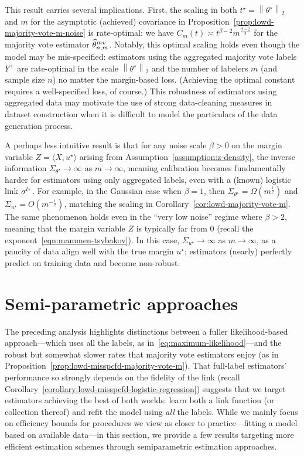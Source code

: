 \documentclass[11pt]{article}
\newcommand{\norm}[1]{\left\|{#1}\right\|} %
\newcommand{\what}[1]{\widehat{#1}}
\newcommand{\majY}{Y^+}
\newcommand{\lr}{^{\textup{lr}}}
\newcommand{\mv}{^{\textup{mv}}}
\newcommand{\lipconst}{\mathsf{L}}
\newcommand{\ltwo}[1]{\norm{#1}_2} %
\newcommand{\<}{\langle} %
\renewcommand{\>}{\rangle}
\newcommand{\half}{\frac{1}{2}}
\newcommand{\opt}{^\star}
\newcommand{\mve}{\what{\theta}\mv_{n,m}} %
\begin{document}
This result carries several implications. First, the scaling in both $t\opt
= \ltwo{\theta\opt}$ and $m$ for the asymptotic (achieved) covariance in
Proposition~\ref{prop:lowd-majority-vote-m-noise} is rate-optimal: we have
$C_m(t) \asymp t^{\beta - 2} m^{\frac{\beta - 2}{2}}$ for the majority vote
estimator $\mve$. Notably, this optimal scaling holds even though the model
may be mis-specified: estimators using the aggregated majority vote labels
$\majY$ are rate-optimal in the scale $\ltwo{\theta\opt}$ and the number of
labelers $m$ (and sample size $n$) no matter the margin-based loss.
(Achieving the optimal constant requires a well-specified loss, of course.)
This robustness of estimators using aggregated data may motivate the use of
strong data-cleaning measures in dataset construction when it is difficult
to model the particulars of the data generation process.

A perhaps less intuitive result is that for any noise scale $\beta > 0$ on
the margin variable $Z = \<X, u\opt\>$ arising from
Assumption~\ref{assumption:z-density}, the inverse information
$\Sigma_{\theta\opt} \to \infty$ as $m \to \infty$, meaning calibration
becomes fundamentally harder for estimators using only aggregated labels,
even with a (known) logistic link $\sigma\lr$. For example, in the Gaussian
case when $\beta = 1$, then $\Sigma_{\theta\opt} = \Omega(m^{\half})$ and
$\Sigma_{u\opt} = O(m^{-\half})$, matching the scaling in
Corollary~\ref{cor:lowd-majority-vote-m}.  The same phenomenon holds even in
the ``very low noise'' regime where $\beta > 2$, meaning that the margin
variable $Z$ is typically far from 0 (recall the
exponent~\eqref{eqn:mammen-tsybakov}). In this case, $\Sigma_{u\opt} \to
\infty$ as $m \to \infty$, as a paucity of data align well with the true
margin $u\opt$; estimators (nearly) perfectly predict on training data and
become non-robust.


\providecommand{\lipconst}{\mathsf{L}}
\newcommand{\uinit}{u_n^{\textup{init}}}
\newcommand{\uerror}{\epsilon}

\section{Semi-parametric approaches}
\label{sec:semi-param}

The preceding analysis highlights distinctions between a fuller
likelihood-based approach---which uses all the labels, as
in~\eqref{eq:maximum-likelihood}---and the robust but somewhat slower rates
that majority vote estimators enjoy (as in
Proposition~\ref{prop:lowd-misspcfd-majority-vote-m}).  That full-label
estimators' performance so strongly depends on the fidelity of the link
(recall Corollary~\ref{corollary:lowd-misspcfd-logistic-regression})
suggests that we target estimators achieving the best of both worlds: learn
both a link function (or collection thereof) and refit the model using
\emph{all} the labels. While we mainly focus on efficiency bounds for
procedures we view as closer to practice---fitting a model based on
available data---in this section, we provide a few results targeting more
efficient estimation schemes through semiparametric estimation approaches.
\end{document}

